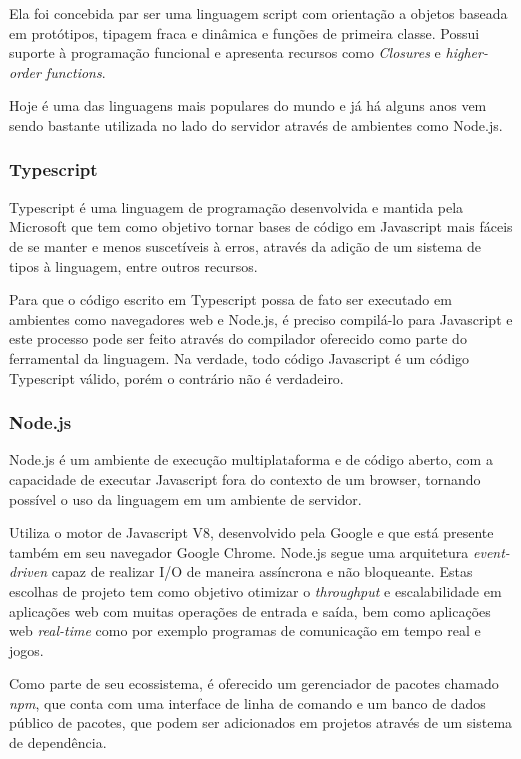             Ela foi concebida par ser uma linguagem script com orientação a objetos baseada em protótipos, tipagem fraca e dinâmica e funções de primeira classe. Possui suporte à programação funcional e apresenta recursos como \textit{Closures} e \textit{higher-order functions}.

            Hoje é uma das linguagens mais populares do mundo e já há alguns anos vem sendo bastante utilizada no lado do servidor através de ambientes como Node.js. 
	
	
            \subsubsection{Typescript}
                Typescript é uma linguagem de programação desenvolvida e mantida pela Microsoft que tem como objetivo tornar bases de código em Javascript mais fáceis de se manter e menos suscetíveis à erros, através da adição de um sistema de tipos à linguagem, entre outros recursos. 

                Para que o código escrito em Typescript possa de fato ser executado em ambientes como navegadores web e Node.js, é preciso compilá-lo para Javascript e este processo pode ser feito através do compilador oferecido como parte do ferramental da linguagem. Na verdade, todo código Javascript é um código Typescript válido, porém o contrário não é verdadeiro.

            \subsubsection{Node.js}
                Node.js é um ambiente de execução multiplataforma e de código aberto, com a capacidade de executar Javascript fora do contexto de um browser, tornando possível o uso da linguagem em um ambiente de servidor.
    
                Utiliza o motor de Javascript V8, desenvolvido pela Google e que está presente também em seu navegador Google Chrome. Node.js segue uma arquitetura \textit{event-driven} capaz de realizar I/O de maneira assíncrona e não bloqueante. Estas escolhas de projeto tem como objetivo otimizar o \textit{throughput} e escalabilidade em aplicações web com muitas operações de entrada e saída, bem como aplicações web \textit{real-time} como por exemplo programas de comunicação em tempo real e jogos.

                Como parte de seu ecossistema, é oferecido um gerenciador de pacotes chamado \textit{npm}, que conta com uma interface de linha de comando e um banco de dados público de pacotes, que podem ser adicionados em projetos através de um sistema de dependência.

